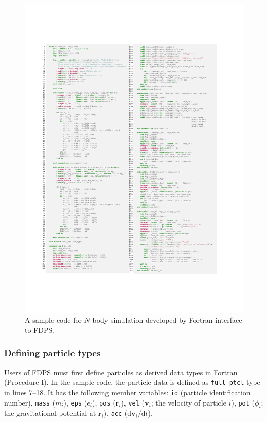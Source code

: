 \documentclass[proof,useamsfonts]{pasj01}
\newcommand{\diff}{{\mathrm d}}
\begin{document}
\begin{figure}[htbp]
\centering
\includegraphics[width=0.95\hsize]{./figures/src_ftn_smpl}
\caption{A sample code for $N$-body simulation developed by Fortran interface to FDPS.}
\label{fig:src_ftn_smpl}  
\end{figure}


\subsubsection{Defining particle types}
\label{subsubsec:def_ptcl_type}
Users of FDPS must first define particles as derived data types in Fortran (Procedure I). In the sample code, the particle data is defined as \texttt{full\_ptcl} type in lines 7--18. It has the following member variables: \texttt{id} (particle identification number), \texttt{mass} ($m_{i}$), \texttt{eps} ($\epsilon_{i}$), \texttt{pos} ($\bm{r}_{i}$), \texttt{vel} ($\bm{v}_{i}$; the velocity of particle $i$), \texttt{pot} ($\phi_{i}$; the gravitational potential at $\bm{r}_{i}$), \texttt{acc} ($\diff \bm{v}_{i}/\diff t$).
\end{document}
